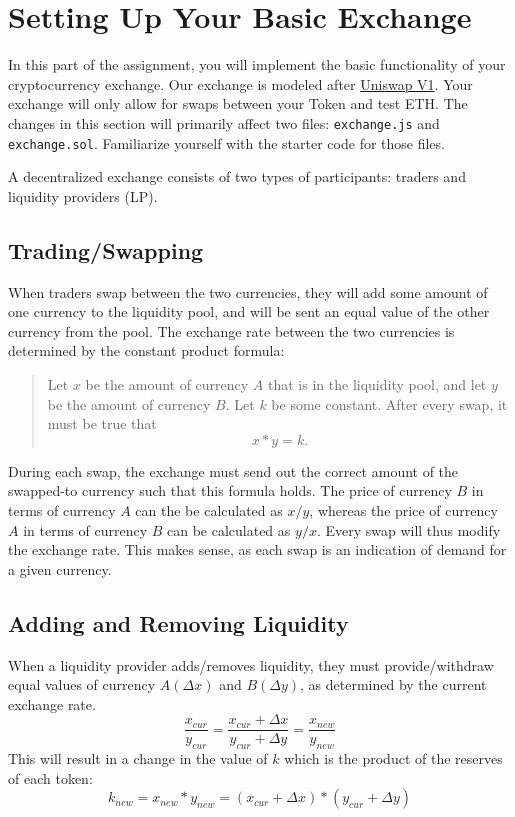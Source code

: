 \documentclass[11pt]{article}
\begin{document}
\section{Setting Up Your Basic Exchange}

In this part of the assignment, you will implement the basic functionality of your cryptocurrency exchange. Our exchange is modeled after \href{https://github.com/runtimeverification/verified-smart-contracts/blob/uniswap/uniswap/x-y-k.pdf}{Uniswap V1}. Your exchange will only allow for swaps between your Token and test ETH. The changes in this section will primarily affect two files: \texttt{exchange.js} and \texttt{exchange.sol}. Familiarize yourself with the starter code for those files. 

A decentralized exchange consists of two types of participants: traders and liquidity providers (LP).
\subsection{Trading/Swapping}
When traders swap between the two currencies, they will add some amount of one currency to the liquidity pool, and will be sent an equal value of the other currency from the pool. The exchange rate between the two currencies is determined by the constant product formula:
\begin{quote}
Let $x$ be the amount of currency $A$ that is in the liquidity pool, and let $y$ be the amount of currency $B$. Let $k$ be some constant. After every swap, it must be true that
$$ x * y = k.$$
\end{quote}
During each swap, the exchange must send out the correct amount of the swapped-to currency such that this formula holds. The price of currency $B$ in terms of currency $A$ can the be calculated as $x / y$, whereas the price of currency $A$ in terms of currency $B$ can be calculated as $y / x$. Every swap will thus modify the exchange rate. This makes sense, as each swap is an indication of demand for a given currency.

\subsection{Adding and Removing Liquidity}
When a liquidity provider adds/removes liquidity, they must provide/withdraw equal values of currency $A (\Delta x)$ and $B (\Delta y)$, as determined by the current exchange rate.
$$\frac{x_{cur}}{y_{cur}} =  \frac{x_{cur}+\Delta x}{y_{cur}+ \Delta y} = \frac{x_{new}}{y_{new}}$$
This will result in a change in the value of $k$ which is the product of the reserves of each token:
$$ k_{new} = x_{new} * y_{new} = (x_{cur}+\Delta x) * (y_{cur}+ \Delta y)$$
\end{document}
